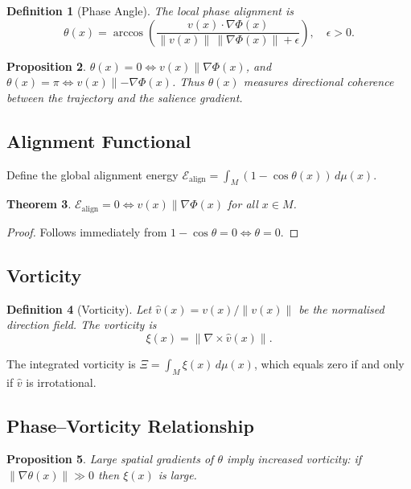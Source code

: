 \documentclass[12pt, a4paper]{article}
\newtheorem{theorem}{Theorem}[section]
\newtheorem{definition}[theorem]{Definition}
\newtheorem{proposition}[theorem]{Proposition}
\theoremstyle{remark}
\theoremstyle{definition}
\begin{document}
\begin{definition}[Phase Angle]
The local phase alignment is
\[
\theta(x)
= \arccos\!\left(
\frac{v(x)\cdot\nabla\Phi(x)}
{\|v(x)\|\,\|\nabla\Phi(x)\|+\epsilon}
\right), \quad \epsilon > 0.
\]
\end{definition}

\begin{proposition}
$\theta(x) = 0 \iff v(x) \parallel \nabla\Phi(x)$, and
$\theta(x) = \pi \iff v(x) \parallel -\nabla\Phi(x)$.
Thus $\theta(x)$ measures directional coherence between the trajectory and the salience
gradient.
\end{proposition}

\subsection{Alignment Functional}

Define the global alignment energy
$\mathcal{E}_{\mathrm{align}} = \int_M (1 - \cos\theta(x))\,d\mu(x)$.

\begin{theorem}
$\mathcal{E}_{\mathrm{align}} = 0 \iff v(x) \parallel \nabla\Phi(x)$ for all $x \in M$.
\end{theorem}

\begin{proof}
Follows immediately from $1 - \cos\theta = 0 \iff \theta = 0$.
\end{proof}

\subsection{Vorticity}

\begin{definition}[Vorticity]
Let $\hat{v}(x) = v(x)/\|v(x)\|$ be the normalised direction field.  The vorticity is
\[
\xi(x) = \|\nabla \times \hat{v}(x)\|.
\]
\end{definition}

The integrated vorticity is $\Xi = \int_M \xi(x)\,d\mu(x)$, which equals zero if and only
if $\hat{v}$ is irrotational.

\subsection{Phase--Vorticity Relationship}

\begin{proposition}
Large spatial gradients of $\theta$ imply increased vorticity: if
$\|\nabla\theta(x)\| \gg 0$ then $\xi(x)$ is large.
\end{proposition}
\end{document}
